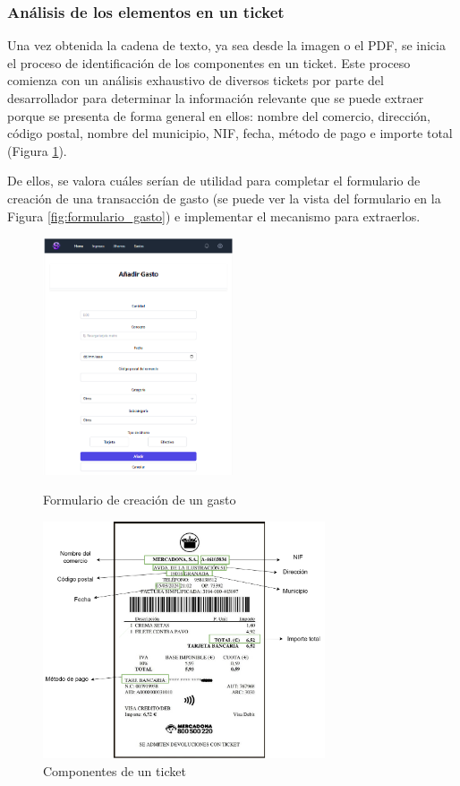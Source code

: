\subsubsection{Análisis de los elementos en un ticket}
Una vez obtenida la cadena de texto, ya sea desde la imagen o el PDF, se inicia el proceso de identificación de los componentes en un ticket. Este proceso comienza con un análisis exhaustivo de diversos tickets por parte del desarrollador para determinar la información relevante que se puede extraer porque se presenta de forma general en ellos: nombre del comercio, dirección, código postal, nombre del municipio, NIF, fecha, método de pago e importe total (Figura \ref{fig:componentes_ticket}).

De ellos, se valora cuáles serían de utilidad para completar el formulario de creación de una transacción de gasto (se puede ver la vista del formulario en la Figura \ref{fig:formulario_gasto}) e implementar el mecanismo para extraerlos.

\begin{figure}[ht!]
    \centering
    \begin{minipage}{0.45\textwidth}
        \centering
        \includegraphics[height = 70mm]{imagenes/formulario_gasto.png}
        \caption{Formulario de creación de un gasto}
        \label{fig:formulario_gasto}
    \end{minipage}\hfill
    \begin{minipage}{0.45\textwidth}
        \centering
        \includegraphics[height = 70mm]{imagenes/componentes_ticket.png}
        \caption{Componentes de un ticket}
        \label{fig:componentes_ticket}
    \end{minipage}
\end{figure}

